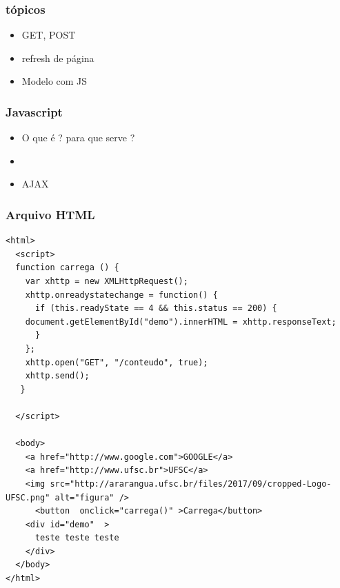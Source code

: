\documentclass[14pt]{beamer}
\begin{document}
\begin{frame}[fragile]
 \frametitle{tópicos}
\begin{itemize}
 \item GET, POST
 \item refresh de página
 \item Modelo com JS
\end{itemize}


\end{frame}

\begin{frame}[fragile]
 \frametitle{Javascript}
\begin{itemize}
 \item O que é ? para que serve ?
 \item 
 \item AJAX
\end{itemize}


\end{frame}

\begin{frame}[fragile]
 \frametitle{Arquivo HTML}
\begin{lstlisting}[basicstyle=\tiny\ttfamily]
<html>
  <script>
  function carrega () {
    var xhttp = new XMLHttpRequest();
    xhttp.onreadystatechange = function() {
      if (this.readyState == 4 && this.status == 200) {
	document.getElementById("demo").innerHTML = xhttp.responseText;
      }
    };
    xhttp.open("GET", "/conteudo", true);
    xhttp.send();
   }
   
  </script>
  
  <body>
    <a href="http://www.google.com">GOOGLE</a>
    <a href="http://www.ufsc.br">UFSC</a>
    <img src="http://ararangua.ufsc.br/files/2017/09/cropped-Logo-UFSC.png" alt="figura" />
      <button  onclick="carrega()" >Carrega</button>
    <div id="demo"  >
      teste teste teste
    </div>
  </body>
</html>
\end{lstlisting}

\end{frame}
\end{document}

